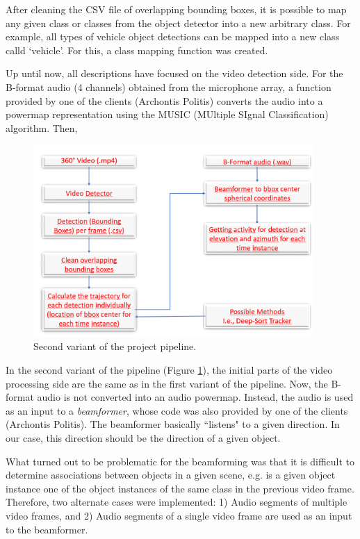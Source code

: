 After cleaning the CSV file of overlapping bounding boxes, it is possible to map any given class or classes from the object detector into a new arbitrary class. For example, all types of vehicle object detections can be mapped into a new class calld `vehicle'. For this, a class mapping function was created.

Up until now, all descriptions have focused on the video detection side. For the B-format audio (4 channels) obtained from the microphone array, a function provided by one of the clients (Archontis Politis) converts the audio into a powermap representation using the MUSIC (MUltiple SIgnal Classification) algorithm. Then,


\begin{figure}[h]
    \centering
    \includegraphics[width=0.95\textwidth]{figures/pipeline_2.png}
    \caption{Second variant of the project pipeline.}
    \label{fig_pipeline_2}
\end{figure}

In the second variant of the pipeline (Figure \ref{fig_pipeline_2}), the initial parts of the video processing side are the same as in the first variant of the pipeline. Now, the B-format audio is not converted into an audio powermap. Instead, the audio is used as an input to a \textit{beamformer}, whose code was also provided by one of the clients (Archontis Politis). The beamformer basically ``listens" to a given direction. In our case, this direction should be the direction of a given object.

What turned out to be problematic for the beamforming was that it is difficult to determine associations between objects in a given scene, e.g. is a given object instance one of the object instances of the same class in the previous video frame. Therefore, two alternate cases were implemented: 1) Audio segments of multiple video frames, and 2) Audio segments of a single video frame are used as an input to the beamformer.

